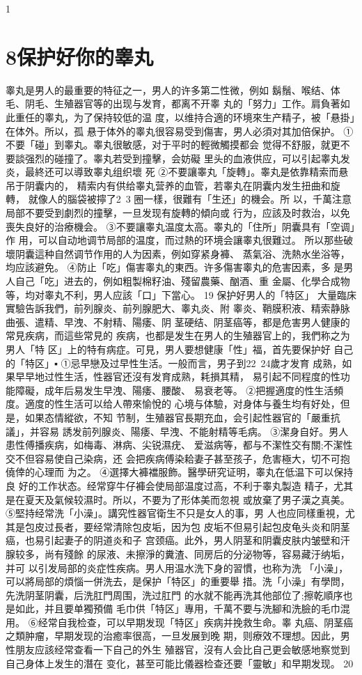 \documentclass[12pt,UTF8]{ctexbook}
\begin{document}
1\section{8保护好你的睾丸}
睾丸是男人的最重要的特征之一，男人的许多第二性微，例如
鬍鬚、喉结、体毛、阴毛、生殖器官等的出现与发育，都离不开睾
丸的「努力」工作。肩負著如此重任的睾丸，为了保持较低的温
度，以维持合適的环境來生产精子，被「悬掛」在体外。所以，孤
悬于体外的睾丸很容易受到傷害，男人必須对其加倍保护。
①不要「碰」到睾丸。睾丸很敏感，对于平时的輕微觸摸都会
觉得不舒服，就更不要談强烈的碰撞了。睾丸若受到撞擊，会妨礙
里头的血液供应，可以引起睾丸发炎，最終还可以導致睾丸组织壞
死
②不要讓睾丸「旋轉」。睾丸是依靠精索而悬吊于阴囊内的，
精索内有供给睾丸营养的血管，若睾丸在阴囊内发生扭曲和旋轉，
就像人的腦袋被擰了2~3 圈一樣，很難有「生还」的機会。所
以，千萬注意局部不要受到劇烈的撞擊，一旦发现有旋轉的傾向或
行为，应該及时救治，以免喪失良好的治療機会。
③不要讓睾丸温度太高。睾丸的「住所」阴囊具有「空调」作
用，可以自动地调节局部的温度，而过熱的环境会讓睾丸很難过。
所以那些破壞阴囊這种自然调节作用的人为因素，例如穿紧身褲、
蒸氣浴、洗熱水坐浴等，均应該避免。
④防止「吃」傷害睾丸的東西。许多傷害睾丸的危害因素，多
是男人自己「吃」进去的，例如粗製棉籽油、殘留農藥、酗酒、重
金屬、化學合成物等，均对睾丸不利，男人应該「口」下當心。
19 保护好男人的「特区」
大量臨床實驗告訴我們，前列腺炎、前列腺肥大、睾丸炎、附
睾炎、鞘膜积液、精索静脉曲張、遣精、早洩、不射精、陽痿、阴
茎硬结、阴茎癌等，都是危害男人健康的常見疾病，而這些常見的
疾病，也都是发生在男人的生殖器官上的，我們称之为男人「特
区」上的特有病症。可見，男人要想健康「性」福，首先要保护好
自己的「特区」▪
①忌早戀及过早性生活。一般而言，男子到22~24歲才发育
成熟，如果早早地过性生活，性器官还沒有发育成熟，耗損其精，
易引起不同程度的性功能障礙，成年后易发生早洩、陽痿、腰酸、
易衰老等。
②把握適度的性生活頻度。適度的性生活可以给人帶來愉悅的
心境与体驗，对身体与養生均有好处，但是，如果态情縱欲，不知
节制，生殖器官長期充血，会引起性器官的「嚴重抗議」，并容易
誘发前列腺炎、陽痿、早洩、不能射精等毛病。
③潔身自好。男人患性傅播疾病，如梅毒、淋病、尖锐濕疣、
爱滋病等，都与不潔性交有關;不潔性交不但容易使自己染病，还
会把疾病傅染耠妻子甚至孩子，危害極大，切不可抱僥倖的心理而
为之。
④選擇大褲襠服飾。醫學研究证明，睾丸在低温下可以保持良
好的工作状态。经常穿牛仔褲会使局部温度过高，不利于睾丸製造
精子，尤其是在夏天及氣候较濕时。所以，不要为了形体美而忽視
或放棄了男子漢之真美。
⑤堅持经常洗「小澡」。講究性器官衛生不只是女人的事，男
人也应同樣重視，尤其是包皮过長者，要经常清除包皮垢，因为包
皮垢不但易引起包皮龟头炎和阴茎癌，也易引起妻子的阴道炎和子
宫颈癌。此外，男人阴茎和阴囊皮肤内皱壁和汗腺较多，尚有殘餘
的尿液、未擦淨的糞渣、同房后的分泌物等，容易藏汙纳垢，并可
以引发局部的炎症性疾病。男人用温水洗下身的習慣，也称为洗
「小澡」，可以將局部的煩惱一併洗去，是保护「特区」的重要舉
措。洗「小澡」有學問，先洗阴茎阴囊，后洗肛門周围，洗过肛門
的水就不能再洗其他部位了;擦乾順序也是如此，并且要单獨預備
毛巾供「特区」專用，千萬不要与洗腳和洗臉的毛巾混用。
⑥经常自我检查，可以早期发现「特区」疾病并挽救生命。睾
丸癌、阴茎癌之類肿瘤，早期发现的治癒率很高，一旦发展到晚
期，则療效不理想。因此，男性朋友应該经常查看一下自己的外生
殖器官，沒有人会比自己更会敏感地察觉到自己身体上发生的潛在
变化，甚至可能比儀器检查还要「靈敏」和早期发现。
20
\end{document}
